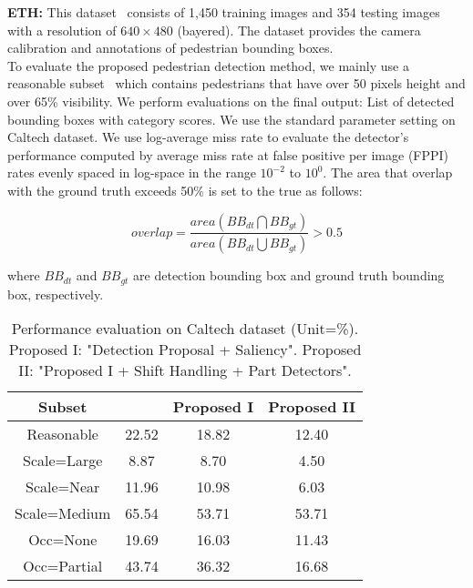 \documentclass[journal]{IEEEtran}
\begin{document}
\textbf{ETH:} This dataset~\cite{eth_biwi_00534} consists of 1,450 training images and 354 testing images with a resolution of $640 \times 480$ (bayered). The dataset provides the camera calibration and annotations of pedestrian bounding boxes. \\

To evaluate the proposed pedestrian detection method, we mainly use a reasonable subset~\cite{Dollar2012PAMI, li2018scale} which contains pedestrians that have over 50 pixels height and over 65\% visibility. We perform evaluations on the final output: List of detected bounding boxes with category scores. We use the standard parameter setting on Caltech dataset. We use log-average miss rate to evaluate the detector's performance computed by average miss rate at false positive per image (FPPI) rates evenly spaced in log-space in the range $10^{-2}$ to $10^{0}$. The area that overlap with the ground truth exceeds 50\% is set to the true as follows:

\begin{equation}
 overlap = \frac{area(BB_{dt} \bigcap BB_{gt})}{area(BB_{dt} \bigcup BB_{gt})} > 0.5
\end{equation}

where $BB_{dt}$ and $BB_{gt}$ are detection bounding box and ground truth bounding box, respectively.

\begin{table}[t]
\caption{Performance evaluation on Caltech dataset (Unit=\%). Proposed I: "Detection Proposal + Saliency". Proposed II: "Proposed I + Shift Handling + Part Detectors". }
\begin{center}
\begin{tabular}[c]{|c|c|c|c|}
\hline
\bf{Subset} & \cite{wang2017part} & Proposed I & Proposed II  \\
\hline
Reasonable & 22.52 & 18.82 & 12.40 \\
\hline
Scale=Large & 8.87 & 8.70 & 4.50 \\
\hline
Scale=Near & 11.96 & 10.98 & 6.03 \\
\hline
Scale=Medium & 65.54 & 53.71 & 53.71 \\
\hline
Occ=None & 19.69 & 16.03 & 11.43 \\
\hline
Occ=Partial & 43.74 & 36.32 & 16.68 \\
\hline
\end{tabular}
\end{center}
\label{table:result1}
\end{table}
\end{document}
